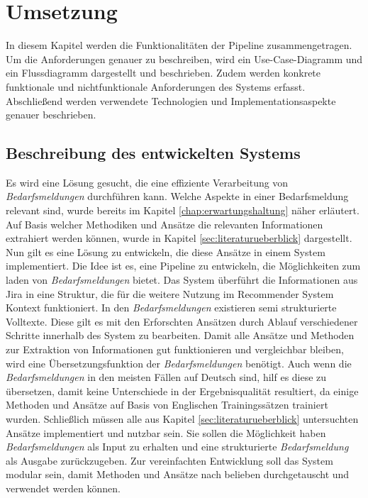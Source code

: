 \chapter{Umsetzung}
\label{chap:implementierung}
In diesem Kapitel werden die Funktionalitäten der Pipeline zusammengetragen. Um die Anforderungen genauer zu beschreiben, wird ein Use-Case-Diagramm und ein Flussdiagramm dargestellt und beschrieben. Zudem werden konkrete funktionale und nichtfunktionale Anforderungen des Systems erfasst. Abschließend werden verwendete Technologien und Implementationsaspekte genauer beschrieben.
\section{Beschreibung des entwickelten Systems}
\label{sec:beschreibungsystem}
Es wird eine Lösung gesucht, die eine effiziente Verarbeitung von \emph{Bedarfsmeldungen} durchführen kann. Welche Aspekte in einer Bedarfsmeldung relevant sind, wurde bereits im Kapitel \ref{chap:erwartungshaltung} näher erläutert. Auf Basis welcher Methodiken und Ansätze die relevanten Informationen extrahiert werden können, wurde in Kapitel \ref{sec:literaturueberblick} dargestellt. Nun gilt es eine Lösung zu entwickeln, die diese Ansätze in einem System implementiert. Die Idee ist es, eine Pipeline zu entwickeln, die Möglichkeiten zum laden von \emph{Bedarfsmeldungen} bietet. Das System überführt die Informationen aus Jira in eine Struktur, die für die weitere Nutzung im Recommender System Kontext funktioniert. In den \emph{Bedarfsmeldungen} existieren semi strukturierte Volltexte. Diese gilt es mit den Erforschten Ansätzen durch Ablauf verschiedener Schritte innerhalb des System zu bearbeiten. Damit alle Ansätze und Methoden zur Extraktion von Informationen gut funktionieren und vergleichbar bleiben, wird eine Übersetzungsfunktion der \emph{Bedarfsmeldungen} benötigt. Auch wenn die \emph{Bedarfsmeldungen} in den meisten Fällen auf Deutsch sind, hilf es diese zu übersetzen, damit keine Unterschiede in der Ergebnisqualität resultiert, da einige Methoden und Ansätze auf Basis von Englischen Trainingssätzen trainiert wurden. Schließlich müssen alle aus Kapitel \ref{sec:literaturueberblick} untersuchten Ansätze implementiert und nutzbar sein. Sie sollen die Möglichkeit haben \emph{Bedarfsmeldungen} als Input zu erhalten und eine strukturierte \emph{Bedarfsmeldung} als Ausgabe zurückzugeben. Zur vereinfachten Entwicklung soll das System modular sein, damit Methoden und Ansätze nach belieben durchgetauscht und verwendet werden können.\\
